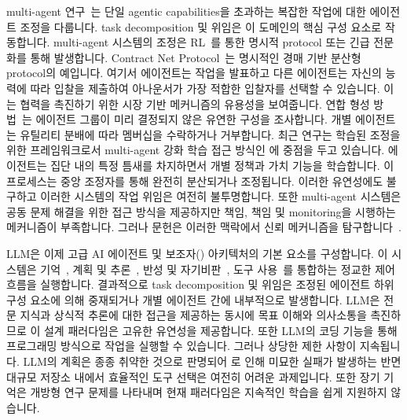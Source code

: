 \documentclass[11pt, a4paper, twocolumn, copyright, goog]{google}
\begin{document}
multi-agent 연구~\citep{du2023review}는 단일 agentic capabilities을 초과하는 복잡한 작업에 대한 에이전트 조정을 다룹니다. task decomposition 및 위임은 이 도메인의 핵심 구성 요소로 작동합니다. multi-agent 시스템의 조정은 RL~\citep{gronauer2022multi, zhu2024survey}를 통한 명시적 protocol 또는 긴급 전문화를 통해 발생합니다. Contract Net Protocol~\citep{smith1980contract, sandholm1993implementation, xu2001evolution, vokvrinek2007competitive}는 명시적인 경매 기반 분산형 protocol의 예입니다. 여기서 에이전트는 작업을 발표하고 다른 에이전트는 자신의 능력에 따라 입찰을 제출하여 아나운서가 가장 적합한 입찰자를 선택할 수 있습니다. 이는 협력을 촉진하기 위한 시장 기반 메커니즘의 유용성을 보여줍니다. 연합 형성 방법~\citep{shehory1997multi, lau2003task, aknine2004multi, mazdin2021distributed, sarkar2022survey, boehmer2025causes}는 에이전트 그룹이 미리 결정되지 않은 유연한 구성을 조사합니다. 개별 에이전트는 유틸리티 분배에 따라 멤버십을 수락하거나 거부합니다. 최근 연구는 학습된 조정을 위한 프레임워크로서 multi-agent 강화 학습 접근 방식인 \citep{foerster2018counterfactual, wang2020qplex, ning2024survey, albrecht2024multi}에 중점을 두고 있습니다. 에이전트는 집단 내의 특정 틈새를 차지하면서 개별 정책과 가치 기능을 학습합니다. 이 프로세스는 중앙 조정자를 통해 완전히 분산되거나 조정됩니다. 이러한 유연성에도 불구하고 이러한 시스템의 작업 위임은 여전히 불투명합니다. 또한 multi-agent 시스템은 공동 문제 해결을 위한 접근 방식을 제공하지만 책임, 책임 및 monitoring을 시행하는 메커니즘이 부족합니다. 그러나 문헌은 이러한 맥락에서 신뢰 메커니즘을 탐구합니다~\citep{ramchurn2004trust, yu2013survey, pinyol2013computational, cheng2021general}.

LLM은 이제 고급 AI 에이전트 및 보조자(\citep{wang2024survey, xi2025rise}) 아키텍처의 기본 요소를 구성합니다. 이 시스템은 기억~\citep{zhang2025survey}, 계획 및 추론~\citep{valmeekam2023planning, hao2023reasoning, xu2025toward}, 반성 및 자기비판~\citep{gou2023critic}, 도구 사용~\citep{ruan2023tptu, paranjape2023art}를 통합하는 정교한 제어 흐름을 실행합니다.  결과적으로 task decomposition 및 위임은 조정된 에이전트 하위 구성 요소에 의해 중재되거나 개별 에이전트 간에 내부적으로 발생합니다. LLM은 전문 지식과 상식적 추론에 대한 접근을 제공하는 동시에 목표 이해와 의사소통을 촉진하므로 이 설계 패러다임은 고유한 유연성을 제공합니다. 또한 LLM의 \citep{nijkamp2022codegen, guo2024deepseek} 코딩 기능을 통해 프로그래밍 방식으로 작업을 실행할 수 있습니다. 그러나 상당한 제한 사항이 지속됩니다. LLM의 계획은 종종 취약한 것으로 판명되어 \citep{huang2023large}로 인해 미묘한 실패가 발생하는 반면 대규모 저장소 내에서 효율적인 도구 선택은 여전히 어려운 과제입니다. 또한 장기 기억은 개방형 연구 문제를 나타내며 현재 패러다임은 지속적인 학습을 쉽게 지원하지 않습니다.
\end{document}
